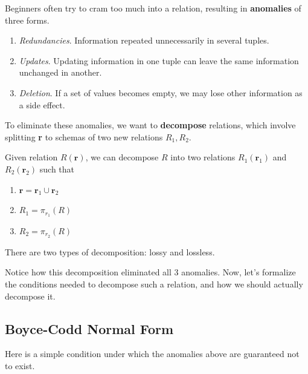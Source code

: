 \documentclass{article}
\begin{document}
    \begin{definition}[Anomaly]
      Beginners often try to cram too much into a relation, resulting in \textbf{anomalies} of three forms. 
      \begin{enumerate}
        \item \textit{Redundancies}. Information repeated unnecessarily in several tuples. 
        \item \textit{Updates}. Updating information in one tuple can leave the same information unchanged in another. 
        \item \textit{Deletion}. If a set of values becomes empty, we may lose other information as a side effect. 
      \end{enumerate}
    \end{definition}

    To eliminate these anomalies, we want to \textbf{decompose} relations, which involve splitting \textbf{r} to schemas of two new relations $R_1, R_2$. 

    \begin{definition}[Decomposition]
      Given relation $R(\mathbf{r})$, we can decompose $R$ into two relations $R_1 (\mathbf{r}_1)$ and $R_2 (\mathbf{r}_2)$ such that 
      \begin{enumerate}
        \item $\mathbf{r} = \mathbf{r}_1 \cup \mathbf{r}_2$ 
        \item $R_1 = \pi_{r_1} (R)$
        \item $R_2 = \pi_{r_2} (R)$
      \end{enumerate}
      There are two types of decomposition: lossy and lossless. 
    \end{definition}

    \begin{example}
      
    \end{example}

    Notice how this decomposition eliminated all 3 anomalies. Now, let's formalize the conditions needed to decompose such a relation, and how we should actually decompose it. 

  \subsection{Boyce-Codd Normal Form}

    Here is a simple condition under which the anomalies above are guaranteed not to exist. 
\end{document}
